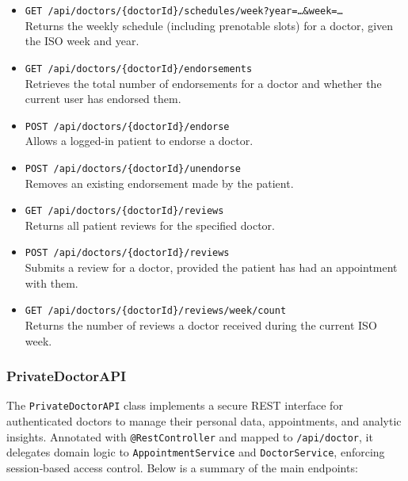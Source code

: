 \begin{itemize}
	\item \texttt{GET /api/doctors/\{doctorId\}/schedules/week?year=\dots\&week=\dots} \\
	Returns the weekly schedule (including prenotable slots) for a doctor, given the ISO week and year.
	
	\item \texttt{GET /api/doctors/\{doctorId\}/endorsements} \\
	Retrieves the total number of endorsements for a doctor and whether the current user has endorsed them.
	
	\item \texttt{POST /api/doctors/\{doctorId\}/endorse} \\
	Allows a logged-in patient to endorse a doctor.
	
	\item \texttt{POST /api/doctors/\{doctorId\}/unendorse} \\
	Removes an existing endorsement made by the patient.
	
	\item \texttt{GET /api/doctors/\{doctorId\}/reviews} \\
	Returns all patient reviews for the specified doctor.
	
	\item \texttt{POST /api/doctors/\{doctorId\}/reviews} \\
	Submits a review for a doctor, provided the patient has had an appointment with them.
	
	\item \texttt{GET /api/doctors/\{doctorId\}/reviews/week/count} \\
	Returns the number of reviews a doctor received during the current ISO week.
\end{itemize}

\subsubsection{PrivateDoctorAPI}
The \texttt{PrivateDoctorAPI} class implements a secure REST interface for authenticated doctors to manage their personal data, appointments, and analytic insights. Annotated with \texttt{@RestController} and mapped to \texttt{/api/doctor}, it delegates domain logic to \texttt{AppointmentService} and \texttt{DoctorService}, enforcing session‐based access control. Below is a summary of the main endpoints:

